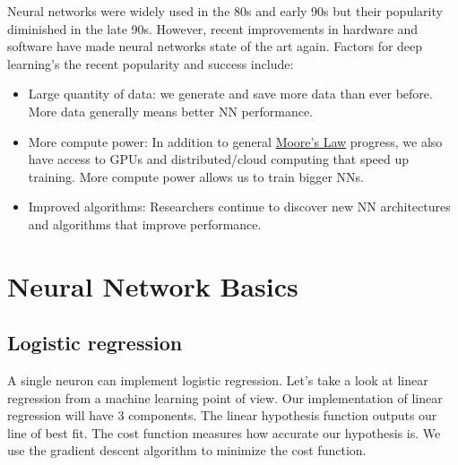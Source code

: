 Neural networks were widely used in the 80s and early 90s but their popularity diminished in the late 90s. However, recent improvements in hardware and software have made neural networks state of the art again. Factors for deep learning's the recent popularity and success include:
\begin{itemize}
	\item Large quantity of data: we generate and save more data than ever before. More data generally means better NN performance.
	\item More compute power: In addition to general \href{https://en.wikipedia.org/wiki/Moore%27s_law}{Moore's Law} progress, we also have access to GPUs and distributed/cloud computing that speed up training. More compute power allows us to train bigger NNs. 
	\item Improved algorithms: Researchers continue to discover new NN architectures and algorithms that improve performance.
\end{itemize}
\section{Neural Network Basics}


\subsection{Logistic regression}
A single neuron can implement logistic regression. Let's take a look at linear regression from a machine learning point of view.
Our implementation of linear regression will have 3 components. The linear hypothesis function outputs our line of best fit. The cost function measures how accurate our hypothesis is. We use the gradient descent algorithm to minimize the cost function. 

